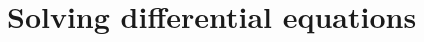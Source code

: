 \documentclass[11pt,a4paper]{book}
\theoremstyle{plain}
\numberwithin{equation}{section}
\begin{document}


\section{Solving differential equations}\label{sec:solv-diff-equat}
\end{document}
